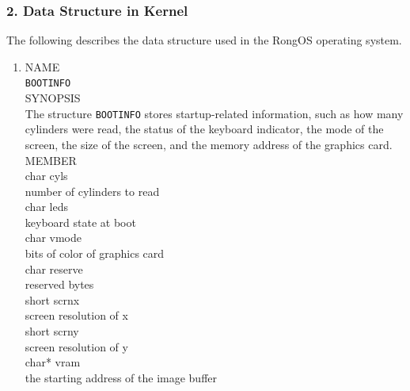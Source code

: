 \documentclass{swfcthesis}
\begin{document}
\subsubsection{2. Data Structure in Kernel}
The following describes the data structure used in the RongOS operating system.

\label{sec:datastructure-kernel}
\begin{enumerate}
\item
  NAME \\
  \hspace*{1cm}\texttt{BOOTINFO} \\
  SYNOPSIS \\
  \hspace*{1cm}The structure \texttt{BOOTINFO} stores startup-related information, such as
  how many cylinders were read, the status of the keyboard indicator, the mode of the
  screen, the size of the screen, and the memory address of the graphics card. \\
  MEMBER \\
  \hspace*{1cm}char cyls \\
  \hspace*{1.5cm} number of cylinders to read \\
  \hspace*{1cm}char leds \\
  \hspace*{1.5cm} keyboard state at boot \\
  \hspace*{1cm}char vmode \\
  \hspace*{1.5cm} bits of color of graphics card \\
  \hspace*{1cm}char reserve \\
  \hspace*{1.5cm} reserved bytes \\
  \hspace*{1cm}short scrnx \\
  \hspace*{1.5cm} screen resolution of x \\
  \hspace*{1cm}short scrny \\
  \hspace*{1.5cm} screen resolution of y \\
  \hspace*{1cm}char* vram \\
  \hspace*{1.5cm}the starting address of the image buffer\\


\end{enumerate}
\end{document}
